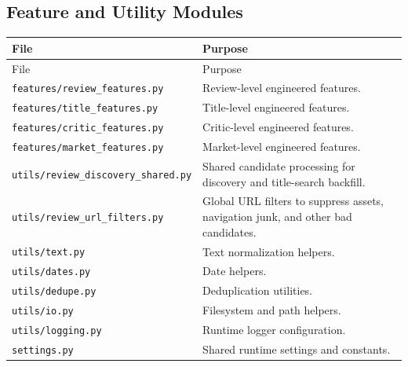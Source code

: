 \documentclass[11pt]{article}
\begin{document}
\subsection{Feature and Utility Modules}
\begin{longtable}{>{\ttfamily}p{}p{}}
\toprule
File & Purpose \\
\midrule
\endfirsthead
\toprule
File & Purpose \\
\midrule
\endhead
\textnormal{\texttt{features/review\_features.py}} & Review-level engineered features. \\
\textnormal{\texttt{features/title\_features.py}} & Title-level engineered features. \\
\textnormal{\texttt{features/critic\_features.py}} & Critic-level engineered features. \\
\textnormal{\texttt{features/market\_features.py}} & Market-level engineered features. \\
\textnormal{\texttt{utils/review\_discovery\_shared.py}} & Shared candidate processing for discovery and title-search backfill. \\
\textnormal{\texttt{utils/review\_url\_filters.py}} & Global URL filters to suppress assets, navigation junk, and other bad candidates. \\
\textnormal{\texttt{utils/text.py}} & Text normalization helpers. \\
\textnormal{\texttt{utils/dates.py}} & Date helpers. \\
\textnormal{\texttt{utils/dedupe.py}} & Deduplication utilities. \\
\textnormal{\texttt{utils/io.py}} & Filesystem and path helpers. \\
\textnormal{\texttt{utils/logging.py}} & Runtime logger configuration. \\
\textnormal{\texttt{settings.py}} & Shared runtime settings and constants. \\
\bottomrule
\end{longtable}
\end{document}
